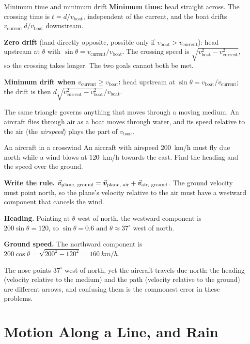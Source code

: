 \begin{keybox}{Minimum time and minimum drift}
\textbf{Minimum time:} head straight across. The crossing time is $t=d/v_{\text{boat}}$, independent of the
current, and the boat drifts $v_{\text{current}}\,d/v_{\text{boat}}$ downstream.

\textbf{Zero drift} (land directly opposite, possible only if $v_{\text{boat}}>v_{\text{current}}$): head
upstream at $\theta$ with $\sin\theta=v_{\text{current}}/v_{\text{boat}}$. The crossing speed is
$\sqrt{v_{\text{boat}}^2-v_{\text{current}}^2}$, so the crossing takes longer. The two goals cannot both be met.

\textbf{Minimum drift when $v_{\text{current}}\ge v_{\text{boat}}$:} head upstream at
$\sin\theta=v_{\text{boat}}/v_{\text{current}}$; the drift is then
$d\sqrt{v_{\text{current}}^2-v_{\text{boat}}^2}\big/v_{\text{boat}}$.
\end{keybox}

The same triangle governs anything that moves through a moving medium. An aircraft flies through air
as a boat moves through water, and its speed relative to the air (the \emph{airspeed}) plays the part of
$v_{\text{boat}}$.

\begin{exbox}{An aircraft in a crosswind}
An aircraft with airspeed \SI{200}{km/h} must fly due north while a wind blows at \SI{120}{km/h}
towards the east. Find the heading and the speed over the ground.

 \textbf{Write the rule.} $\vec{\bm{v}}_{\text{plane, ground}}=\vec{\bm{v}}_{\text{plane, air}}+\vec{\bm{v}}_{\text{air, ground}}$.
The ground velocity must point north, so the plane's velocity relative to the air must have a westward
component that cancels the wind.

 \textbf{Heading.} Pointing at $\theta$ west of north, the westward component is
$200\sin\theta=120$, so $\sin\theta=0.6$ and $\theta\approx37^\circ$ west of north.

 \textbf{Ground speed.} The northward component is
$200\cos\theta=\sqrt{200^2-120^2}=\SI{160}{km/h}$.

The nose points $37^\circ$ west of north, yet the aircraft travels due north: the heading (velocity
relative to the medium) and the path (velocity relative to the ground) are different arrows, and
confusing them is the commonest error in these problems.
\end{exbox}

\section{Motion Along a Line, and Rain}

